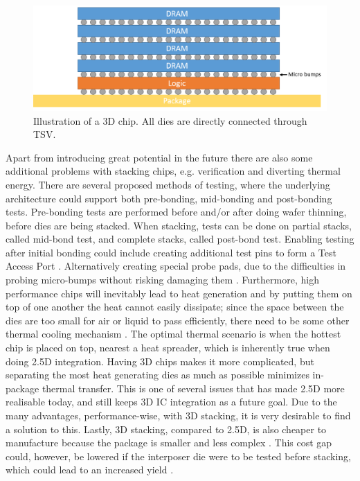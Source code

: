 \begin{figure}[!h]
\centering
\includegraphics[width=0.75\linewidth]{figure/3D-integration.png}
\caption{Illustration of a 3D chip. All dies are directly connected through TSV.}
\label{3D-chip}
\end{figure}

Apart from introducing great potential in the future there are also some additional problems with stacking chips, e.g. verification and diverting thermal energy. There are several proposed methods of testing, where the underlying architecture could support both pre-bonding, mid-bonding and post-bonding tests. Pre-bonding tests are performed before and/or after doing wafer thinning, before dies are being stacked. When stacking, tests can be done on partial stacks, called mid-bond test, and complete stacks, called post-bond test. Enabling testing after initial bonding could include creating additional test pins to form a Test Access Port \cite{Marinissen:2012:CES:2492708.2493023}. Alternatively creating special probe pads, due to the difficulties in probing micro-bumps without risking damaging them \cite{5751450}. Furthermore, high performance chips will inevitably lead to heat generation and by putting them  on top of one another the heat cannot easily dissipate; since the space between the dies are too small for air or liquid to pass efficiently, there need to be some other thermal cooling mechanism \cite{5501261}. The optimal thermal scenario is when the hottest chip is placed on top, nearest a heat spreader, which is inherently true when doing 2.5D integration. Having 3D chips makes it more complicated, but separating the most heat generating dies as much as possible minimizes in-package thermal transfer. This is one of several issues that has made 2.5D more realisable today, and still keeps 3D IC integration as a future goal. Due to the many advantages, performance-wise, with 3D stacking, it is very desirable to find a solution to this. Lastly, 3D stacking, compared to 2.5D, is also cheaper to manufacture because the package is smaller and less complex \cite{6263032}. This cost gap could, however, be lowered if the interposer die were to be tested before stacking, which could lead to an increased yield \cite{6542130}.


